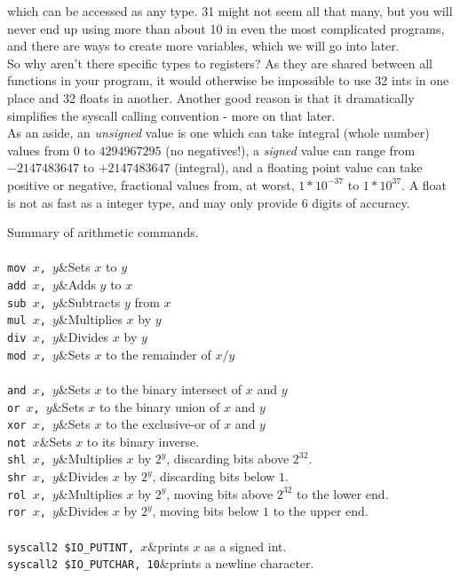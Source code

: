 \documentclass[a4paper,oneside,openany]{book}
\begin{document}
which can be accessed as any type. 31 might not seem all that many, but you will
never end up using more than about 10 in even the most complicated programs, and
there are ways to create more variables, which we will go into later.\\
So why aren't there specific types to registers? As they are shared between all functions in your program, it would otherwise be impossible to use 32 ints in one place and 32 floats in another. Another good reason is that it dramatically simplifies the syscall calling convention - more on that later.\\
As an aside, an \emph{unsigned} value is one which can take integral (whole number)
values from $0$ to $4294967295$ (no negatives!), a \emph{signed} value can range from
$-2147483647$ to $+2147483647$ (integral), and a floating point value can take
positive or negative, fractional values from, at worst, $1*10^{-37}$ to $1*10^{37}$.
A float is not as fast as a integer type, and may only provide 6 digits of accuracy.
\begin{codetablefig}{Summary of arithmetic commands.}
\\
\\
\texttt{mov $x$, $y$}&Sets $x$ to $y$\\
\texttt{add $x$, $y$}&Adds $y$ to $x$\\
\texttt{sub $x$, $y$}&Subtracts $y$ from $x$\\
\texttt{mul $x$, $y$}&Multiplies $x$ by $y$\\
\texttt{div $x$, $y$}&Divides $x$ by $y$\\
\texttt{mod $x$, $y$}&Sets $x$ to the remainder of $x / y$\\
\\
\texttt{and $x$, $y$}&Sets $x$ to the binary intersect of $x$ and $y$\\
\texttt{or $x$, $y$}&Sets $x$ to the binary union of $x$ and $y$\\
\texttt{xor $x$, $y$}&Sets $x$ to the exclusive-or of $x$ and $y$\\
\texttt{not $x$}&Sets $x$ to its binary inverse.\\
\texttt{shl $x$, $y$}&Multiplies $x$ by $2^y$, discarding bits above $2^{32}$.\\
\texttt{shr $x$, $y$}&Divides $x$ by $2^y$, discarding bits below $1$.\\
\texttt{rol $x$, $y$}&Multiplies $x$ by $2^y$, moving bits above $2^{32}$ to the lower end.\\
\texttt{ror $x$, $y$}&Divides $x$ by $2^y$, moving bits below $1$ to the upper end.\\
\\
\texttt{syscall2 \$IO\_PUTINT, $x$}&prints $x$ as a signed int.\\
\texttt{syscall2 \$IO\_PUTCHAR, 10}&prints a newline character.\\
\end{codetablefig}
\end{document}
